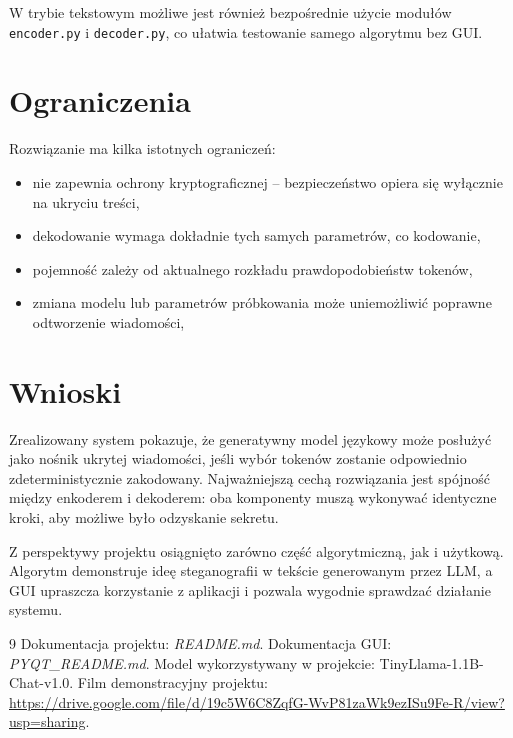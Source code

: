 \documentclass[12pt,a4paper]{article}
\begin{document}
W trybie tekstowym możliwe jest również bezpośrednie użycie modułów \texttt{encoder.py} i \texttt{decoder.py}, co ułatwia testowanie samego algorytmu bez GUI.

\section{Ograniczenia}
Rozwiązanie ma kilka istotnych ograniczeń:
\begin{itemize}
    \item nie zapewnia ochrony kryptograficznej -- bezpieczeństwo opiera się wyłącznie na ukryciu treści,
    \item dekodowanie wymaga dokładnie tych samych parametrów, co kodowanie,
    \item pojemność zależy od aktualnego rozkładu prawdopodobieństw tokenów,
    \item zmiana modelu lub parametrów próbkowania może uniemożliwić poprawne odtworzenie wiadomości,
\end{itemize}

\section{Wnioski}
Zrealizowany system pokazuje, że generatywny model językowy może posłużyć jako nośnik ukrytej wiadomości, jeśli wybór tokenów zostanie odpowiednio zdeterministycznie zakodowany. Najważniejszą cechą rozwiązania jest spójność między enkoderem i dekoderem: oba komponenty muszą wykonywać identyczne kroki, aby możliwe było odzyskanie sekretu.

Z perspektywy projektu osiągnięto zarówno część algorytmiczną, jak i użytkową. Algorytm demonstruje ideę steganografii w tekście generowanym przez LLM, a GUI upraszcza korzystanie z aplikacji i pozwala wygodnie sprawdzać działanie systemu.

\begin{thebibliography}{9}
 Dokumentacja projektu: \textit{README.md}.
 Dokumentacja GUI: \textit{PYQT\_README.md}.
 Model wykorzystywany w projekcie: TinyLlama-1.1B-Chat-v1.0.
 Film demonstracyjny projektu: \url{https://drive.google.com/file/d/19c5W6C8ZqfG-WvP81zaWk9ezISu9Fe-R/view?usp=sharing}.
\end{thebibliography}
\end{document}
